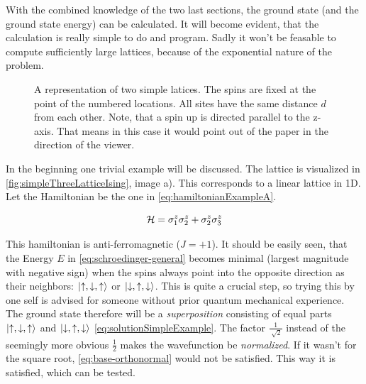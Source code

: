 With the combined knowledge of the two last sections, the ground state (and the ground state energy) can be calculated. It will become evident, that the calculation is really simple to do and program. Sadly it won't be feasable to compute sufficiently large lattices, because of the exponential nature of the problem.

\begin{figure}[htbp]
    \centering
    \vspace{-1cm}
    \caption{A representation of two simple latices. The spins are fixed at the point of the numbered locations. All sites have the same distance $d$ from each other. Note, that a spin up \up is directed parallel to the z-axis. That means in this case it would point out of the paper in the direction of the viewer.}
    \label{fig:simpleThreeLatticeIsing}
\end{figure}

In the beginning one trivial example will be discussed. The lattice is visualized in \autoref{fig:simpleThreeLatticeIsing}, image a).
This corresponds to a linear lattice in 1D. Let the Hamiltonian be the one in \ref{eq:hamiltonianExampleA}.

\begin{equation}
    \label{eq:hamiltonianExampleA}
    \mathcal{H} = \sigma^z_1\sigma^z_2 + \sigma^z_2\sigma^z_3
\end{equation}

This hamiltonian is anti-ferromagnetic ($J = +1$). It should be easily seen, that the Energy $E$ in \ref{eq:schroedinger-general} becomes minimal (largest magnitude with negative sign) when the spins always point into the opposite direction as their neighbors: $\ket{\uparrow, \downarrow, \uparrow}$ or $\ket{\downarrow, \uparrow, \downarrow}$. This is quite a crucial step, so trying this by one self is advised for someone without prior quantum mechanical experience.
The ground state therefore will be a \emph{superposition} consisting of equal parts $\ket{\uparrow, \downarrow, \uparrow}$ and $\ket{\downarrow, \uparrow, \downarrow}$ \ref{eq:solutionSimpleExample}. The factor $\frac{1}{\sqrt[]{2}}$ instead of the seemingly more obvious $\frac{1}{2}$ makes the wavefunction be \emph{normalized}. If it wasn't for the square root, \autoref{eq:base-orthonormal} would not be satisfied. This way it is satisfied, which can be tested.

